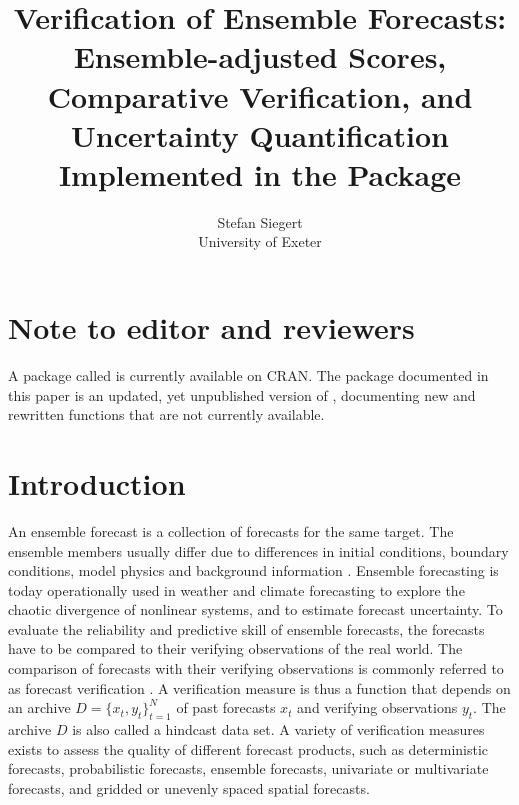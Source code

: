 \documentclass[article]{jss}\usepackage{graphicx, color}
\author{Stefan Siegert\\University of Exeter}
\title{Verification of Ensemble Forecasts: Ensemble-adjusted Scores, Comparative Verification, and Uncertainty Quantification Implemented in the \proglang{R} Package \pkg{SpecsVerification}}
\begin{document}

\section*{Note to editor and reviewers}

A package called  is currently available on CRAN.
The package documented in this paper is an updated, yet unpublished version of , documenting new and rewritten functions that are not currently available.



\section{Introduction}

An ensemble forecast is a collection of forecasts for the same target.
The ensemble members usually differ due to differences in initial conditions, boundary conditions, model physics and background information \citep{gneiting2005atmospheric, leutbecher2008ensemble}.
Ensemble forecasting is today operationally used in weather and climate forecasting to explore the chaotic divergence of nonlinear systems, and to estimate forecast uncertainty.
To evaluate the reliability and predictive skill of ensemble forecasts, the forecasts have to be compared to their verifying observations of the real world.
%
The comparison of forecasts with their verifying observations is commonly referred to as forecast verification \citep{jolliffe2012forecast}.
A verification measure is thus a function that depends on an archive $D=\{x_t, y_t\}_{t=1}^N$ of past forecasts $x_t$ and verifying observations $y_t$.
The archive $D$ is also called a hindcast data set.
A variety of verification measures exists to assess the quality of different forecast products, such as deterministic forecasts, probabilistic forecasts, ensemble forecasts, univariate or multivariate forecasts, and gridded or unevenly spaced spatial forecasts.
\end{document}
